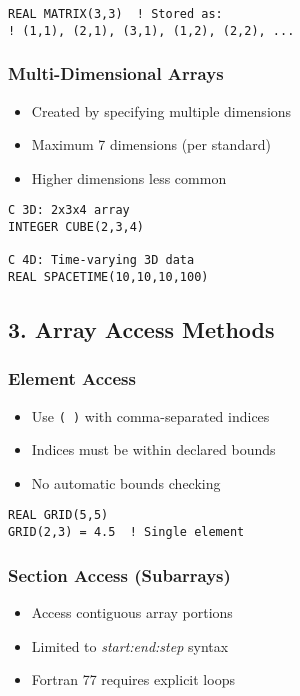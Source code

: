 \documentclass{book}
\begin{document}
\begin{verbatim}
REAL MATRIX(3,3)  ! Stored as:
! (1,1), (2,1), (3,1), (1,2), (2,2), ...
\end{verbatim}

\subsubsection*{Multi-Dimensional Arrays}
\begin{itemize}
\item Created by specifying multiple dimensions
\item Maximum 7 dimensions (per standard)
\item Higher dimensions less common
\end{itemize}

\begin{verbatim}
C 3D: 2x3x4 array
INTEGER CUBE(2,3,4)

C 4D: Time-varying 3D data
REAL SPACETIME(10,10,10,100)
\end{verbatim}

\subsection*{3. Array Access Methods}
\subsubsection*{Element Access}
\begin{itemize}
\item Use \texttt{( )} with comma-separated indices
\item Indices must be within declared bounds
\item No automatic bounds checking
\end{itemize}

\begin{verbatim}
REAL GRID(5,5)
GRID(2,3) = 4.5  ! Single element
\end{verbatim}

\subsubsection*{Section Access (Subarrays)}
\begin{itemize}
\item Access contiguous array portions
\item Limited to \textit{start:end:step} syntax
\item Fortran 77 requires explicit loops
\end{itemize}
\end{document}
